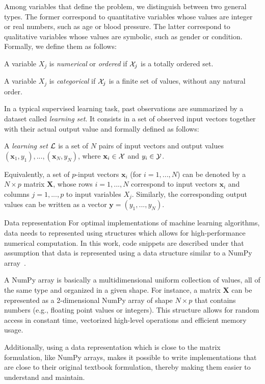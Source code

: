 Among variables that define the problem, we distinguish between two general
types. The former correspond to quantitative variables whose values are integer
or real numbers, such as age or blood pressure. The latter correspond to
qualitative variables whose values are symbolic, such as gender or condition.
Formally, we define them as follows:

\begin{definition}
A variable $X_j$ is \emph{numerical} or \emph{ordered} if ${\cal X}_j$ is a
totally ordered set.
\end{definition}

\begin{definition}
A variable $X_j$ is \emph{categorical} if ${\cal X}_j$ is a finite set of values,
without any natural order.
\end{definition}

In a typical supervised learning task, past observations are summarized by a
dataset called {\it learning set}. It consists in a set of observed input
vectors together with their actual output value and formally defined as
follows:

\begin{definition}
A \emph{learning set} ${\cal L}$ is a set of $N$
pairs of input vectors and output values $(\mathbf{x}_1, y_1), ...,
(\mathbf{x}_N, y_N)$, where $\mathbf{x}_i \in {\cal X}$ and $y_i \in {\cal Y}$.
\end{definition}

Equivalently, a set of $p$-input vectors $\mathbf{x}_i$ (for $i=1, ..., N$) can
be denoted by a $N\times p$ matrix $\mathbf{X}$, whose rows $i=1, ..., N$
correspond to input vectors $\mathbf{x}_i$ and columns $j=1, ..., p$ to input
variables $X_j$. Similarly, the corresponding output values can be written as a
vector $\mathbf{y}=(y_1, ..., y_N)$.

\begin{remark}{Data representation}
For optimal implementations of machine learning algorithms, data needs to
represented using structures which allows for high-performance numerical
computation. In this work, code snippets are described under  that assumption
that data is represented using a data structure similar to a NumPy
array~\citep{vanderwalt:2011}.

A NumPy array is basically a multidimensional uniform collection of values, all
of the same type and organized in a given shape. For instance, a matrix
$\mathbf{X}$ can be represented as a 2-dimensional NumPy array of shape $N
\times p$ that contains numbers (e.g., floating point values or integers). This
structure allows for random access in constant time, vectorized high-level
operations and efficient memory usage.

Additionally, using a data representation which is close to the matrix
formulation, like NumPy arrays, makes it possible to write implementations that
are close to their original textbook formulation, thereby making them easier to
understand and maintain. \end{remark}

